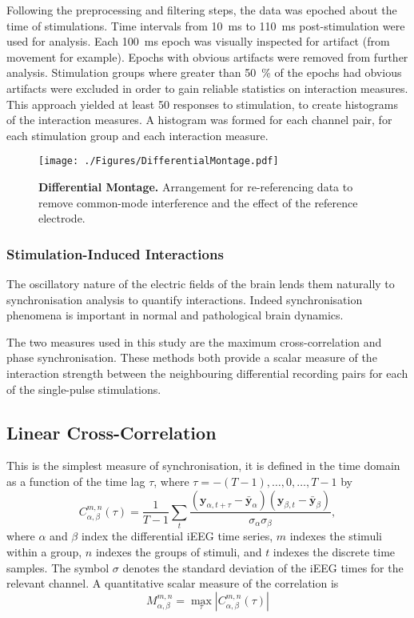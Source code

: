 \documentclass[]{article}
\begin{document}
Following the preprocessing and filtering steps, the data was epoched about the time of stimulations. Time intervals from 10~ms to 110~ms post-stimulation were used for analysis. Each 100~ms epoch was visually inspected for artifact (from movement for example). Epochs with obvious artifacts were removed from further analysis. Stimulation groups where greater than 50~\% of the epochs had obvious artifacts were excluded in order to gain reliable statistics on interaction measures. This approach yielded at least 50 responses to stimulation, to create histograms of the interaction measures. A histogram was formed for each channel pair, for each stimulation group and each interaction measure. 

\begin{figure}[htbp]
	\centering
		\texttt{[image: ./Figures/DifferentialMontage.pdf]}
	\caption{\textbf{Differential Montage.} Arrangement for re-referencing data to remove common-mode interference and the effect of the reference electrode.}
	\label{fig:DifMontage}
\end{figure}

\subsubsection{Stimulation-Induced Interactions}

The oscillatory nature of the electric fields of the brain lends them naturally to synchronisation analysis to quantify interactions. Indeed synchronisation phenomena is important in normal and pathological brain dynamics.

The two measures used in this study are the maximum cross-correlation and phase synchronisation. These methods both provide a scalar measure of the interaction strength between the neighbouring differential recording pairs for each of the single-pulse stimulations. 

\subsection{Linear Cross-Correlation}
This is the simplest measure of synchronisation, it is defined in
the time domain as a function of the time lag $\tau$, where $\tau =
-(T-1),\hdots,0,\hdots,T-1$ by
\begin{equation}
	C_{\alpha,\beta}^{m,n} (\tau) = \frac{1}{T-1} \sum_t\frac{(\mathbf y_{\alpha,t+\tau}-\bar{\mathbf{y}}_{\alpha}) (\mathbf{y}_{\beta,t} - \bar{\mathbf{y}}_{\beta})}{\sigma_{\alpha}\sigma_{\beta}},
\end{equation}
where $\alpha$ and $\beta$ index the differential iEEG time series, $m$ indexes the stimuli within a group, $n$ indexes the groups of stimuli, and $t$ indexes the discrete time samples. The symbol $\sigma$ denotes the standard deviation of the iEEG times for the relevant channel. A quantitative scalar measure of the correlation is
\begin{equation}
	M_{\alpha,\beta}^{m,n} = \max_\tau\left|C_{\alpha,\beta}^{m,n}(\tau)\right|
\end{equation}
\end{document}
